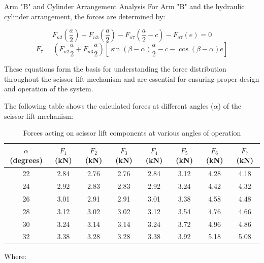 \documentclass[../../main]{subfiles}
\begin{document}
  Arm "B" and Cylinder Arrangement Analysis
For Arm "B" and the hydraulic cylinder arrangement, the forces are determined by:

\begin{equation}
  F_{n2}\left(\frac{a}{2}\right) + F_{n3}\left(\frac{a}{2}\right) - F_{n7}\left(\frac{a}{2} - c\right) - F_{a7}(e) = 0
\end{equation}
\begin{equation}
  F_7 = \left(F_{n2}\frac{a}{2} + F_{n3}\frac{a}{2}\right) \left[\sin(\beta - \alpha)\frac{a}{2} - c - \cos(\beta - \alpha)e\right]
\end{equation}


These equations form the basis for understanding the force distribution
throughout the scissor lift mechanism and are essential for ensuring
proper design and operation of the system.

The following table shows the calculated forces at different angles ($\alpha$)
of the scissor lift mechanism:

\begin{table}[h!]
    \centering
    \begin{tcolorbox}[
      colback=red!5!white,colframe=red!75!black,
      title={\textbf{Forces}},
      fonttitle=\bfseries, coltitle=white, width=\linewidth]
    \begin{tabular}{|c|c|c|c|c|c|c|c|}
        \hline \rowcolor{red!20}
        $\alpha$ (degrees) & $F_1$ (kN) & $F_2$ (kN) & $F_3$ (kN) & $F_4$ (kN) & $F_5$ (kN) & $F_6$ (kN) & $F_7$ (kN) \\ \hline
        22 & 2.84 & 2.76 & 2.76 & 2.84 & 3.12 & 4.28 & 4.18 \\ \hline
        24 & 2.92 & 2.83 & 2.83 & 2.92 & 3.24 & 4.42 & 4.32 \\ \hline
        26 & 3.01 & 2.91 & 2.91 & 3.01 & 3.38 & 4.58 & 4.48 \\ \hline
        28 & 3.12 & 3.02 & 3.02 & 3.12 & 3.54 & 4.76 & 4.66 \\ \hline
        30 & 3.24 & 3.14 & 3.14 & 3.24 & 3.72 & 4.96 & 4.86 \\ \hline
        32 & 3.38 & 3.28 & 3.28 & 3.38 & 3.92 & 5.18 & 5.08 \\ \hline
    \end{tabular}
  \end{tcolorbox}
    \caption{Forces acting on scissor lift components at various angles of operation}
\end{table}

Where:
\end{document}
